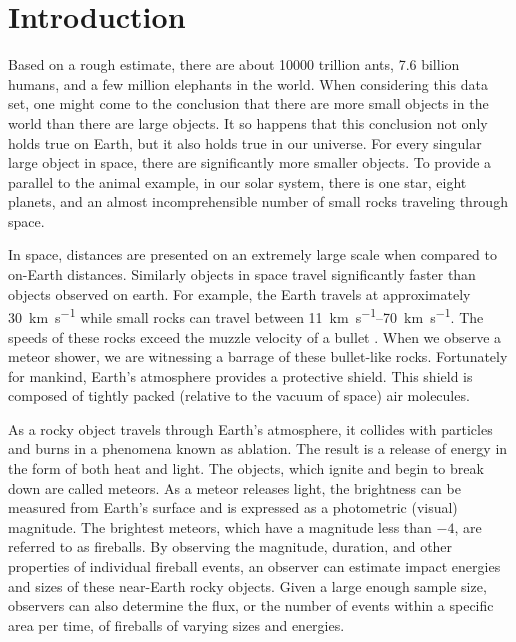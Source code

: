 \chapter{Introduction}

Based on a rough estimate, there are about \num{10000} trillion ants, \num{7.6} billion humans, and a few million elephants in the world.
When considering this data set, one might come to the conclusion that there are more small objects in the world than there are large objects.
It so happens that this conclusion not only holds true on Earth, but it also holds true in our universe.
For every singular large object in space, there are significantly more smaller objects.
To provide a parallel to the animal example, in our solar system, there is one star, eight planets, and an almost incomprehensible number of small rocks traveling through space. 

In space, distances are presented on an extremely large scale when compared to on-Earth distances.  
Similarly objects in space travel significantly faster than objects observed on earth.
For example, the Earth travels at approximately \SI{30}{\kilo\meter\per\second} while small rocks can travel between \SIrange{11}{70}{\kilo\meter\per\second}.  
The speeds of these rocks exceed the muzzle velocity of a bullet \cite{russell_photometry_2018}.
When we observe a meteor shower, we are witnessing a barrage of these bullet-like rocks.  
Fortunately for mankind, Earth’s atmosphere provides a protective shield.
This shield is composed of tightly packed (relative to the vacuum of space) air molecules.

As a rocky object travels through Earth’s atmosphere, it collides with particles and burns in a phenomena known as ablation.  
The result is a release of energy in the form of both heat and light.  
The objects, which ignite and begin to break down are called meteors.
As a meteor releases light, the brightness can be measured from Earth's surface and is expressed as a photometric (visual) magnitude. 
The brightest meteors, which have a magnitude less than $-4$, are referred to as fireballs.
By observing the magnitude, duration, and other properties of individual fireball events, an observer can estimate impact energies and sizes of these near-Earth rocky objects.
Given a large enough sample size, observers can also determine the flux, or the number of events within a specific area per time, of fireballs of varying sizes and energies.

